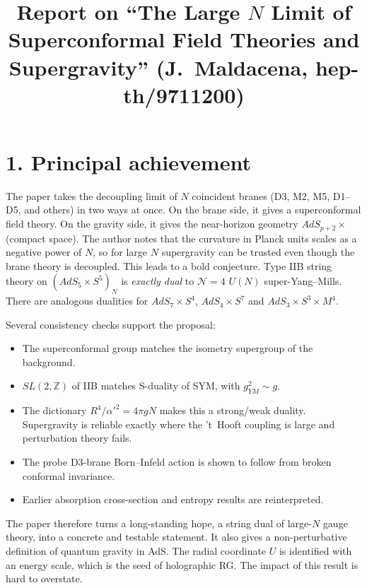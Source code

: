 \documentclass[11pt]{article}
\title{Report on ``The Large $N$ Limit of Superconformal Field Theories and Supergravity'' (J.~Maldacena, hep-th/9711200)}
\date{}
\begin{document}
\maketitle

\section*{1. Principal achievement}
The paper takes the decoupling limit of $N$ coincident branes (D3, M2, M5, D1--D5, and others) in two ways at once. On the brane side, it gives a superconformal field theory. On the gravity side, it gives the near-horizon geometry $AdS_{p+2}\times$(compact space). The author notes that the curvature in Planck units scales as a negative power of $N$, so for large $N$ supergravity can be trusted even though the brane theory is decoupled. This leads to a bold conjecture. Type IIB string theory on $(AdS_5\times S^5)_N$ is \emph{exactly dual} to $\mathcal{N}=4$ $U(N)$ super-Yang--Mills. There are analogous dualities for $AdS_7\times S^4$, $AdS_4\times S^7$ and $AdS_3\times S^3\times M^4$.

Several consistency checks support the proposal:
\begin{itemize}
\item The superconformal group matches the isometry supergroup of the background.
\item $SL(2,\mathbb{Z})$ of IIB matches S-duality of SYM, with $g_{YM}^2\sim g$.
\item The dictionary $R^4/\alpha'^2 = 4\pi gN$ makes this a strong/weak duality. Supergravity is reliable exactly where the 't~Hooft coupling is large and perturbation theory fails.
\item The probe D3-brane Born--Infeld action is shown to follow from broken conformal invariance.
\item Earlier absorption cross-section and entropy results are reinterpreted.
\end{itemize}
The paper therefore turns a long-standing hope, a string dual of large-$N$ gauge theory, into a concrete and testable statement. It also gives a non-perturbative definition of quantum gravity in AdS. The radial coordinate $U$ is identified with an energy scale, which is the seed of holographic RG. The impact of this result is hard to overstate.
\end{document}
